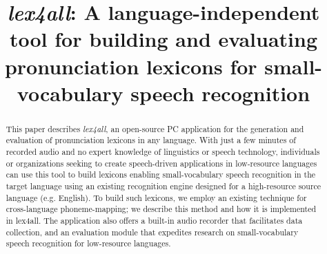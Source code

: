 \documentclass[11pt]{article}
\title{\textit{lex4all}: A language-independent tool for building and evaluating pronunciation lexicons for small-vocabulary speech recognition}
\date{}
\begin{document}
\maketitle

\begin{abstract}
This paper describes \textit{lex4all}, an open-source PC application for the generation and evaluation of pronunciation lexicons in any language. 
With just a few minutes of recorded audio and no expert knowledge of linguistics or speech technology, individuals or organizations seeking to create speech-driven applications in low-resource languages can use this tool to build  lexicons enabling small-vocabulary speech recognition in the target language using an existing recognition engine designed for a high-resource source language (e.g. English). 
To build such lexicons, we employ an existing technique for cross-language phoneme-mapping; 
we describe this method and how it is implemented in lex4all.
The application also offers
a built-in audio recorder that facilitates data collection, and an evaluation module that expedites research on small-vocabulary speech recognition for low-resource languages. 
\end{abstract}


%
\end{document}
